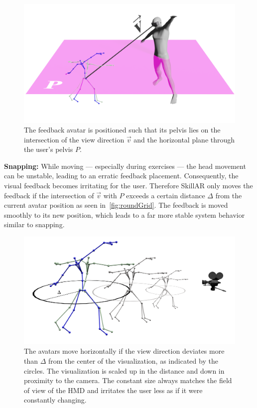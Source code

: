 \begin{figure}[h!]
	\centering
	\includegraphics[width=0.6\linewidth]{pictures/avatarPos.png}
	\caption{The feedback avatar is positioned such that its pelvis lies on the intersection of the view direction $\vec{v}$ and the horizontal plane through the user's pelvis $P$.\label{fig:positioning}}
\end{figure}

\textbf{Snapping:}
While moving --- especially during exercises --- the head movement can be unstable, leading to an erratic feedback placement. Consequently, the visual feedback becomes irritating for the user. Therefore SkillAR only moves the feedback if the intersection of $\vec{v}$ with $P$ exceeds a certain distance $\Delta$ from the current avatar position as seen in~\autoref{fig:roundGrid}. The feedback is moved smoothly to its new position, which leads to a far more stable system behavior similar to snapping.

\begin{figure}[h!]
	\centering
	\includegraphics[width=0.6\linewidth]{pictures/gridRound.png}
	\caption{The avatars move horizontally if the view direction deviates more than $\Delta$ from the center of the visualization, as indicated by the circles. The visualization is scaled up in the distance and down in proximity to the camera. The constant size always matches the field of view of the HMD and irritates the user less as if it were constantly changing.\label{fig:roundGrid}}
\end{figure}

